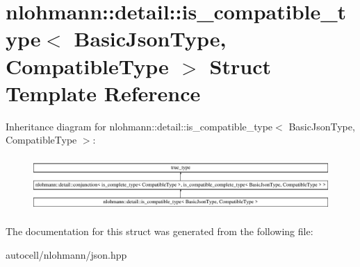 \hypertarget{structnlohmann_1_1detail_1_1is__compatible__type}{}\section{nlohmann\+:\+:detail\+:\+:is\+\_\+compatible\+\_\+type$<$ Basic\+Json\+Type, Compatible\+Type $>$ Struct Template Reference}
\label{structnlohmann_1_1detail_1_1is__compatible__type}
Inheritance diagram for nlohmann\+:\+:detail\+:\+:is\+\_\+compatible\+\_\+type$<$ Basic\+Json\+Type, Compatible\+Type $>$\+:\begin{figure}[H]
\begin{center}
\leavevmode
\includegraphics[height=2.105263cm]{structnlohmann_1_1detail_1_1is__compatible__type}
\end{center}
\end{figure}


The documentation for this struct was generated from the following file\+:\begin{DoxyCompactItemize}
\item 
autocell/nlohmann/json.\+hpp\end{DoxyCompactItemize}
